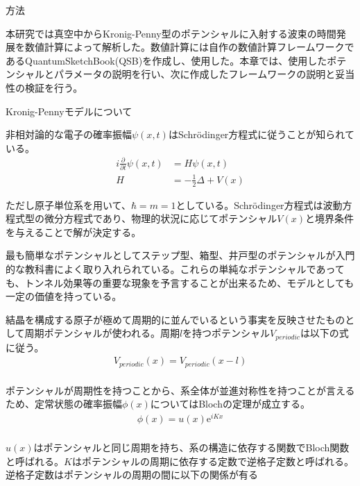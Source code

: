 \documentclass[a4paper, lualatex]{bxjsarticle}
\begin{document}
\begin{section}{方法}
    \par 本研究では真空中からKronig-Penny型のポテンシャルに入射する波束の時間発展を数値計算によって解析した。数値計算には自作の数値計算フレームワークであるQuantumSketchBook(QSB)を作成し、使用した。本章では、使用したポテンシャルとパラメータの説明を行い、次に作成したフレームワークの説明と妥当性の検証を行う。
    \begin{subsection}{Kronig-Pennyモデルについて}
        \par 非相対論的な電子の確率振幅$\psi(x,t)$はSchrödinger方程式に従うことが知られている。
        \begin{align}
         i \frac{\partial}{\partial t}\psi(x, t) &= H \psi(x, t)\nonumber\\
             H &= -\frac{1}{2}\Delta + V(x)
        \end{align}
        \par ただし原子単位系を用いて、$\hbar=m=1$としている。Schrödinger方程式は波動方程式型の微分方程式であり、物理的状況に応じてポテンシャル$V(x)$と境界条件を与えることで解が決定する。
        \par 最も簡単なポテンシャルとしてステップ型、箱型、井戸型のポテンシャルが入門的な教科書によく取り入れられている。これらの単純なポテンシャルであっても、トンネル効果等の重要な現象を予言することが出来るため、モデルとしても一定の価値を持っている。
        \par 結晶を構成する原子が極めて周期的に並んでいるという事実を反映させたものとして周期ポテンシャルが使われる。周期$l$を持つポテンシャル$V_{periodic}$は以下の式に従う。
        \begin{align}
         V_{periodic}(x)=V_{periodic}(x-l)\nonumber\\
        \end{align}
        \par ポテンシャルが周期性を持つことから、系全体が並進対称性を持つことが言えるため、定常状態の確率振幅$\phi(x)$についてはBlochの定理が成立する。
            \begin{align}
             \phi(x)=u(x)\mathrm{e}^{iKx}\nonumber\\
            \end{align}
        \end{subsection}
        \par $u(x)$はポテンシャルと同じ周期を持ち、系の構造に依存する関数でBloch関数と呼ばれる。$K$はポテンシャルの周期に依存する定数で逆格子定数と呼ばれる。逆格子定数はポテンシャルの周期の間に以下の関係が有る

\end{section}
\end{document}
